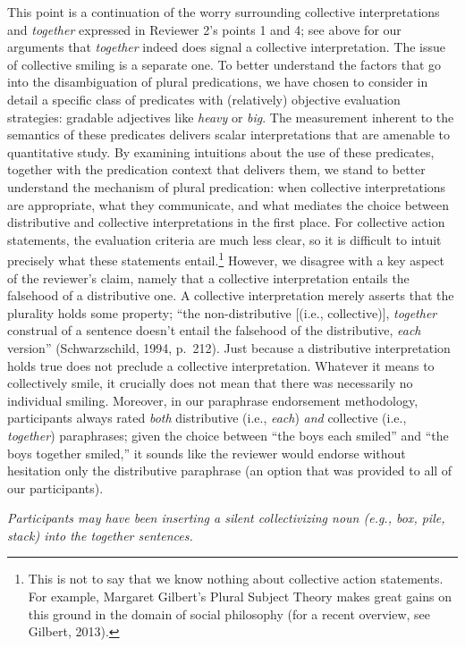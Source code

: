 \documentclass[12pt]{article}
\begin{document}
This point is a continuation of the worry surrounding collective interpretations and \emph{together} expressed in Reviewer 2's points 1 and 4; see above for our arguments that \emph{together} indeed does signal a collective interpretation. The issue of collective smiling is a separate one. To better understand the factors that go into the disambiguation of plural predications, we have chosen to consider in detail a specific class of predicates with (relatively) objective evaluation strategies: gradable adjectives like \emph{heavy} or \emph{big}. 
The measurement inherent to the semantics of these predicates delivers scalar interpretations that are amenable to quantitative study. By examining intuitions about the use of these predicates, together with the predication context that delivers them, we stand to better understand the mechanism of plural predication: when collective interpretations are appropriate, what they communicate, and what mediates the choice between distributive and collective interpretations in the first place. For collective action statements, the evaluation criteria are much less clear, so it is difficult to intuit precisely what these statements entail.\footnote{This is not to say that we know nothing about collective action statements. For example, Margaret Gilbert's Plural Subject Theory makes great gains on this ground in the domain of social philosophy (for a recent overview, see Gilbert, 2013).} However, we disagree with a key aspect of the reviewer's claim, namely that a collective interpretation entails the falsehood of a distributive one. A collective interpretation merely asserts that the plurality holds some property; ``the non-distributive [(i.e., collective)], \emph{together} construal of a sentence doesn't entail the falsehood of the distributive, \emph{each} version'' (Schwarzschild, 1994, p.~212). Just because a distributive interpretation holds true does not preclude a collective interpretation. Whatever it means to collectively smile, it crucially does not mean that there was necessarily no individual smiling. Moreover, in our paraphrase endorsement methodology, participants always rated \emph{both} distributive (i.e., \emph{each}) \emph{and} collective (i.e., \emph{together}) paraphrases; given the choice between ``the boys each smiled'' and ``the boys together smiled,'' it sounds like the reviewer would endorse without hesitation only the distributive paraphrase (an option that was provided to all of our participants).

\item \emph{Participants may have been inserting a silent collectivizing noun (e.g., \emph{box}, \emph{pile}, \emph{stack}) into the \emph{together} sentences.}
\end{document}
